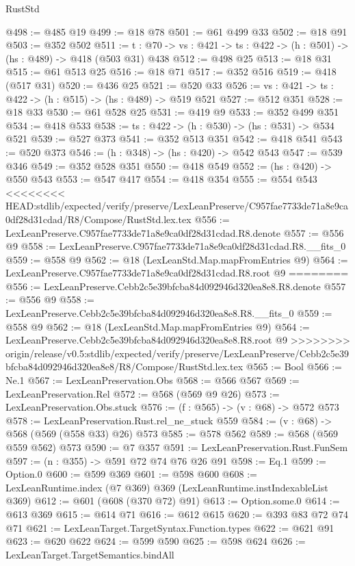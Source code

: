 \begin{lexlean}{RustStd}
\begin{coremodule}
{\begin{coremodule}
@498 := @485 @19
@499 := @18 @78
@501 := @61 @499 @33
@502 := @18 @91
@503 := @352 @502
@511 := {t : @70} -> {vs : @421} -> {ts : @422} -> (h : @501) -> (hs : @489) -> @418 (@503 @31) @438
@512 := @498 @25
@513 := @18 @31
@515 := @61 @513 @25
@516 := @18 @71
@517 := @352 @516
@519 := @418 (@517 @31)
@520 := @436 @25
@521 := @520 @33
@526 := {vs : @421} -> {ts : @422} -> (h : @515) -> (hs : @489) -> @519 @521
@527 := @512 @351
@528 := @18 @33
@530 := @61 @528 @25
@531 := @419 @9
@533 := @352 @499 @351
@534 := @418 @533
@538 := {ts : @422} -> (h : @530) -> (hs : @531) -> @534 @521
@539 := @527 @373
@541 := @352 @513 @351
@542 := @418 @541
@543 := @520 @373
@546 := (h : @348) -> (hs : @420) -> @542 @543
@547 := @539 @346
@549 := @352 @528 @351
@550 := @418 @549
@552 := (hs : @420) -> @550 @543
@553 := @547 @417
@554 := @418 @354
@555 := @554 @543
<<<<<<<< HEAD:stdlib/expected/verify/preserve/LexLeanPreserve/C957fae7733de71a8e9ca0df28d31cdad/R8/Compose/RustStd.lex.tex
@556 := LexLeanPreserve.C957fae7733de71a8e9ca0df28d31cdad.R8.denote
@557 := @556 @9
@558 := LexLeanPreserve.C957fae7733de71a8e9ca0df28d31cdad.R8.__fits_0
@559 := @558 @9
@562 := @18 (LexLeanStd.Map.mapFromEntries @9)
@564 := LexLeanPreserve.C957fae7733de71a8e9ca0df28d31cdad.R8.root @9
========
@556 := LexLeanPreserve.Cebb2c5e39bfcba84d092946d320ea8e8.R8.denote
@557 := @556 @9
@558 := LexLeanPreserve.Cebb2c5e39bfcba84d092946d320ea8e8.R8.__fits_0
@559 := @558 @9
@562 := @18 (LexLeanStd.Map.mapFromEntries @9)
@564 := LexLeanPreserve.Cebb2c5e39bfcba84d092946d320ea8e8.R8.root @9
>>>>>>>> origin/release/v0.5:stdlib/expected/verify/preserve/LexLeanPreserve/Cebb2c5e39bfcba84d092946d320ea8e8/R8/Compose/RustStd.lex.tex
@565 := Bool
@566 := Ne.{1}
@567 := LexLeanPreservation.Obs
@568 := @566 @567
@569 := LexLeanPreservation.Rel
@572 := @568 (@569 @9 @26)
@573 := LexLeanPreservation.Obs.stuck
@576 := (f : @565) -> (v : @68) -> @572 @573
@578 := LexLeanPreservation.Rust.rel_ne_stuck @559
@584 := (v : @68) -> @568 (@569 (@558 @33) @26) @573
@585 := @578 @562
@589 := @568 (@569 @559 @562) @573
@590 := @7 @357
@591 := LexLeanPreservation.Rust.FunSem
@597 := (n : @355) -> @591 @72 @74 @76 @26 @91
@598 := Eq.{1}
@599 := Option.{0}
@600 := @599 @369
@601 := @598 @600
@608 := LexLeanRuntime.index (@7 @369) @369 (LexLeanRuntime.instIndexableList @369)
@612 := @601 (@608 (@370 @72) @91)
@613 := Option.some.{0}
@614 := @613 @369
@615 := @614 @71
@616 := @612 @615
@620 := @393 @83 @72 @74 @71
@621 := LexLeanTarget.TargetSyntax.Function.types
@622 := @621 @91
@623 := @620 @622
@624 := @599 @590
@625 := @598 @624
@626 := LexLeanTarget.TargetSemantics.bindAll

\end{coremodule}}
\end{coremodule}
\end{lexlean}
